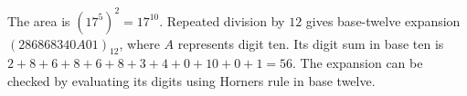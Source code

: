 The area is $(17^5)^2=17^{10}$. Repeated division by $12$ gives base-twelve expansion $(286868340A01)_{12}$, where $A$ represents digit ten. Its digit sum in base ten is $2+8+6+8+6+8+3+4+0+10+0+1=\boxed{56}$. The expansion can be checked by evaluating its digits using Horner\textquotesingle s rule in base twelve.
